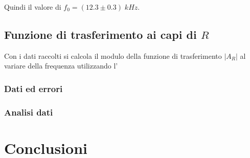 \documentclass[11pt, a4paper]{article}
\numberwithin{equation}{section} %
\begin{document}
Quindi il valore di \(f_{0} = (12.3 \pm 0.3) \; kHz\).

\newpage

\subsection{Funzione di trasferimento ai capi di $R$}

Con i dati raccolti si calcola il modulo della funzione di trasferimento $|A_{R}|$ al variare della frequenza utilizzando l' %

\subsubsection{Dati ed errori}



\subsubsection{Analisi dati}


\section{Conclusioni}

\end{document}
